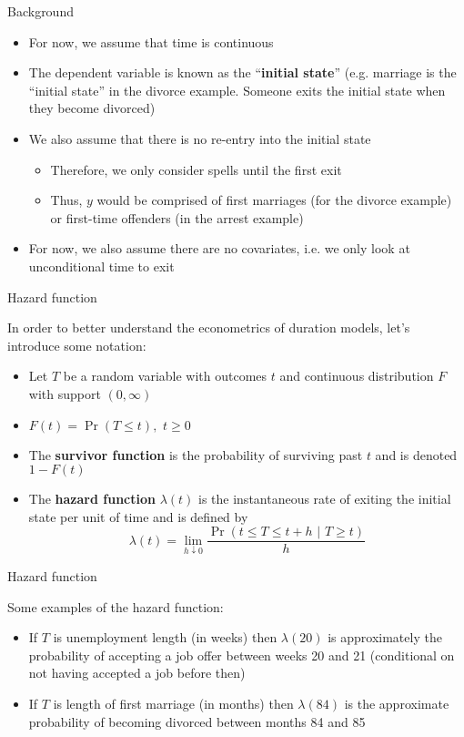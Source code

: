 \documentclass[english,xcolor=dvipsnames]{beamer}
\begin{document}
\begin{frame}{Background}
\begin{itemize}
\item For now, we assume that time is continuous
\item The dependent variable is known as the {}``\textbf{initial state}''
(e.g. marriage is the {}``initial state'' in the divorce example.
Someone exits the initial state when they become divorced)
\item We also assume that there is no re-entry into the initial state

\begin{itemize}
\item Therefore, we only consider spells until the first exit
\item Thus, $y$ would be comprised of first marriages (for the divorce
example) or first-time offenders (in the arrest example)
\end{itemize}
\item For now, we also assume there are no covariates, i.e. we only look
at unconditional time to exit
\end{itemize}

\end{frame}


\begin{frame}{Hazard function}

In order to better understand the econometrics of duration models,
let's introduce some notation:
\begin{itemize}
\item Let $T$ be a random variable with outcomes $t$ and continuous distribution
$F$ with support $\left(0,\infty\right)$
\item $F\left(t\right)=\Pr\left(T\leq t\right),\,\, t\geq0$
\item The \textbf{survivor function} is the probability of surviving past
$t$ and is denoted $1-F\left(t\right)$
\item The \textbf{hazard function} $\lambda\left(t\right)$ is the instantaneous
rate of exiting the initial state per unit of time and is defined
by
\[
\lambda\left(t\right)=\lim_{h\downarrow0}\frac{\Pr\left(t\leq T\leq t+h\,\,\vert\,\, T\geq t\right)}{h}
\]

\end{itemize}

\end{frame}


\begin{frame}{Hazard function}

Some examples of the hazard function:
\begin{itemize}
\item If $T$ is unemployment length (in weeks) then $\lambda\left(20\right)$
is approximately the probability of accepting a job offer between
weeks 20 and 21 (conditional on not having accepted a job before then)
\item If $T$ is length of first marriage (in months) then $\lambda\left(84\right)$
is the approximate probability of becoming divorced between months
84 and 85
\end{itemize}

\end{frame}
\end{document}
